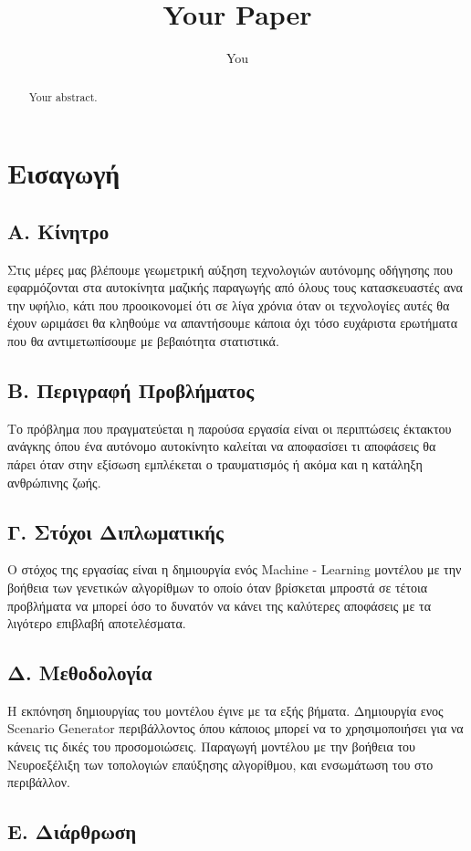 \documentclass{article}
\title{Your Paper}
\author{You}
\begin{document}
\maketitle

\begin{abstract}
Your abstract.
\end{abstract}

\section{Εισαγωγή}


\subsection{Α. Κίνητρο}
Στις μέρες μας βλέπουμε γεωμετρική αύξηση τεχνολογιών αυτόνομης οδήγησης που εφαρμόζονται στα αυτοκίνητα μαζικής παραγωγής από όλους τους κατασκευαστές ανα την υφήλιο, κάτι που προοικονομεί ότι σε λίγα χρόνια όταν οι τεχνολογίες αυτές θα έχουν ωριμάσει θα κληθούμε να απαντήσουμε κάποια όχι τόσο ευχάριστα ερωτήματα που θα αντιμετωπίσουμε με βεβαιότητα στατιστικά.
\subsection{Β. Περιγραφή Προβλήματος}
Το πρόβλημα που πραγματεύεται η παρούσα εργασία είναι οι περιπτώσεις έκτακτου ανάγκης όπου ένα αυτόνομο αυτοκίνητο καλείται να αποφασίσει τι αποφάσεις θα πάρει όταν στην εξίσωση εμπλέκεται ο τραυματισμός ή ακόμα και η κατάληξη ανθρώπινης ζωής. 
\subsection{Γ. Στόχοι Διπλωματικής}
Ο στόχος της εργασίας είναι η δημιουργία ενός Machine - Learning μοντέλου με την βοήθεια των γενετικών αλγορίθμων το οποίο όταν βρίσκεται μπροστά σε τέτοια προβλήματα να μπορεί όσο το δυνατόν να κάνει της καλύτερες αποφάσεις με τα λιγότερο επιβλαβή αποτελέσματα.
\subsection{Δ. Μεθοδολογία}
Η εκπόνηση δημιουργίας του μοντέλου έγινε με τα εξής βήματα. Δημιουργία ενος Scenario Generator περιβάλλοντος όπου κάποιος μπορεί να το χρησιμοποιήσει για να κάνεις τις δικές του προσομοιώσεις. Παραγωγή μοντέλου με την βοήθεια του Νευροεξέλιξη των τοπολογιών επαύξησης αλγορίθμου, και ενσωμάτωση του στο περιβάλλον.

\subsection{Ε. Διάρθρωση}
\end{document}
